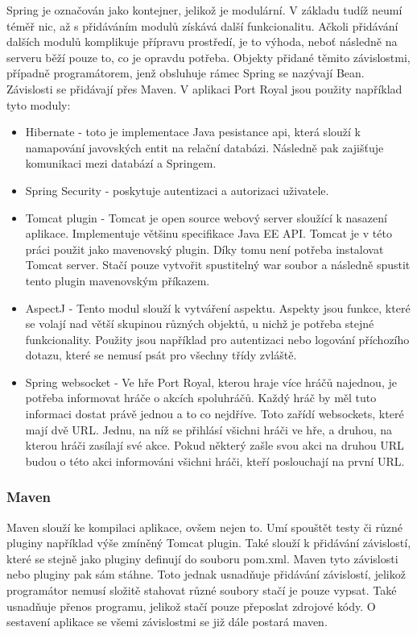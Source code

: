 \documentclass[czech,master,public,dept460,male,cpdeclaration,twoside]{diploma}
\begin{document}
Spring je označován jako kontejner, jelikož je modulární. V základu tudíž neumí téměř nic, až s přidáváním modulů získává další funkcionalitu. Ačkoli  přidávání dalších modulů komplikuje přípravu prostředí, je to výhoda, neboť následně na serveru běží pouze to, co je opravdu potřeba. Objekty přidané těmito závislostmi, případně programátorem, jenž obsluhuje rámec Spring se nazývají Bean. Závislosti se přidávají přes Maven. V aplikaci Port Royal jsou použity například tyto moduly:
\begin{itemize}
	\item Hibernate - toto je implementace Java pesistance api, která slouží k namapování javovských entit na relační databázi. Následně pak zajišťuje komunikaci mezi databází a Springem.
	\item Spring Security - poskytuje autentizaci a autorizaci uživatele.
	\item Tomcat plugin - Tomcat je open source webový server sloužící k nasazení aplikace. Implementuje většinu specifikace Java EE API. Tomcat je v této práci použit jako mavenovský plugin. Díky tomu není potřeba instalovat Tomcat server. Stačí pouze vytvořit spustitelný war soubor a následně spustit tento plugin mavenovským příkazem.
	\item AspectJ - Tento modul slouží k vytváření aspektu. Aspekty jsou funkce, které se volají nad větší skupinou různých objektů, u nichž je potřeba stejné funkcionality. Použity jsou například pro autentizaci nebo logování příchozího dotazu, které se nemusí psát pro všechny třídy zvláště.
	\item Spring websocket - Ve hře Port Royal, kterou hraje více hráčů najednou, je potřeba informovat hráče o akcích spoluhráčů. Každý hráč by měl tuto informaci dostat právě jednou a to co nejdříve. Toto zařídí websockets, které mají dvě URL. Jednu, na níž se přihlásí všichni hráči ve hře, a druhou, na kterou hráči zasílají své akce. Pokud některý zašle svou akci na druhou URL budou o této akci informováni všichni hráči, kteří poslouchají na první URL.
\end{itemize}

\subsubsection{Maven}
Maven slouží ke kompilaci aplikace, ovšem nejen to. Umí spouštět testy či různé pluginy například výše zmíněný Tomcat plugin. Také slouží k přidávání závislostí, které se stejně jako pluginy definují do souboru pom.xml. Maven tyto závislosti nebo pluginy pak sám stáhne. Toto jednak usnadňuje přidávání závislostí, jelikož programátor nemusí složitě stahovat různé soubory stačí je pouze vypsat. Také usnadňuje přenos programu, jelikož stačí pouze přeposlat zdrojové kódy. O sestavení aplikace se všemi závislostmi se již dále postará maven.
\end{document}
